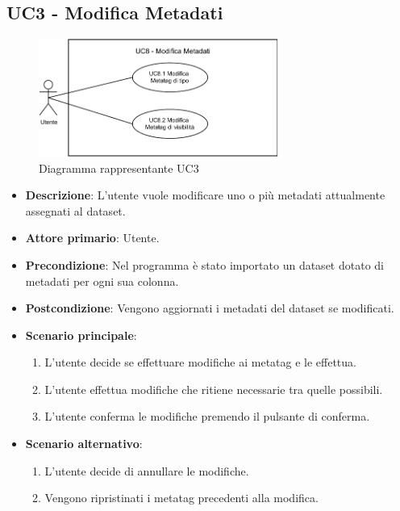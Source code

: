 \newpage
\subsection{UC3 - Modifica Metadati}
\label{subsec:uc3}

\begin{figure}[h]
    \centering
    \includegraphics[width=0.7\textwidth]{componenti/casi-duso/diagrammi/UC3.pdf}
    \caption{Diagramma rappresentante UC3}
    \label{fig:UC3}
\end{figure}

\begin{itemize}
    \item \textbf{Descrizione}: L’utente vuole modificare uno o più metadati attualmente assegnati al dataset.
	
    \item \textbf{Attore primario}: Utente.
    
    \item \textbf{Precondizione}:   Nel programma è stato importato un dataset dotato di metadati per ogni sua colonna.
    \item \textbf{Postcondizione}:  Vengono aggiornati i metadati del dataset se modificati.

	\item \textbf{Scenario principale}:
		\begin{enumerate}
			\item L'utente decide se effettuare modifiche ai metatag e le effettua.
			\item L'utente effettua modifiche che ritiene necessarie tra quelle possibili.
			\item L'utente conferma le modifiche premendo il pulsante di conferma.
        \end{enumerate}

    \item \textbf{Scenario alternativo}:
		\begin{enumerate}
			\item L'utente decide di annullare le modifiche.
			\item Vengono ripristinati i metatag precedenti alla modifica.
        \end{enumerate}
\end{itemize}
\newpage
